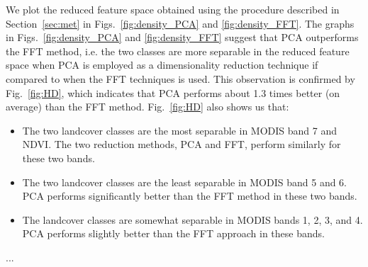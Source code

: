 \documentclass{article}
\begin{document}
We plot the reduced feature space obtained using the procedure described in Section~\ref{sec:met} in Figs.~\ref{fig:density_PCA} and \ref{fig:density_FFT}. The graphs in Figs.~\ref{fig:density_PCA} and \ref{fig:density_FFT} suggest that PCA outperforms the FFT method, i.e. the two 
classes are more separable in the reduced feature space when PCA is employed as a dimensionality reduction technique if compared to when the FFT techniques is used. This observation is confirmed 
by Fig.~\ref{fig:HD}, which indicates that PCA performs about 1.3 times better (on average) than the FFT method. Fig.~\ref{fig:HD} also shows us that:
\begin{itemize}
 \item The two landcover classes are the most separable in MODIS band 7 and NDVI. The two reduction methods, PCA and FFT, perform similarly for these two bands.
 \item The two landcover classes are the least separable in MODIS band 5 and 6. PCA performs significantly better than the FFT method in these two bands.
 \item The landcover classes are somewhat separable in MODIS bands 1, 2, 3, and 4. PCA performs slightly better than the FFT approach in these bands. 
\end{itemize}

...
\end{document}
